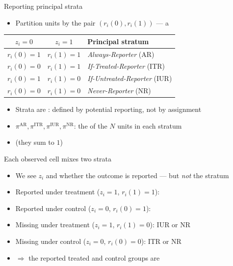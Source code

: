 \documentclass[table, xcolor = {dvipsnames}, 9pt]{beamer}
\theoremstyle{plain}
\newcommand{\mh}[1]{{\color{magenta}{#1}}}
\begin{document}
\begin{frame}[t]{Reporting principal strata}
\vfill
\begin{itemize} \vfill
\item Partition units by the pair $\left(r_i(0), r_i(1)\right)$ --- a \mh{principal stratum} \vfill
\end{itemize}
\vfill
\begin{table}[H]
\centering
\begin{tabular}{c|c|l}
$z_i = 0$ & $z_i = 1$ & Principal stratum \\ \hline
$r_i(0) = 1$ & $r_i(1) = 1$ & \textit{Always-Reporter} (AR) \\
$r_i(0) = 0$ & $r_i(1) = 1$ & \textit{If-Treated-Reporter} (ITR) \\
$r_i(0) = 1$ & $r_i(1) = 0$ & \textit{If-Untreated-Reporter} (IUR) \\
$r_i(0) = 0$ & $r_i(1) = 0$ & \textit{Never-Reporter} (NR) \\
\end{tabular}
\end{table}
\vfill
\begin{itemize} \vfill
\item Strata are \mh{fixed}: defined by potential reporting, not by assignment \vfill
\item $\pi^{\textrm{AR}}, \pi^{\textrm{ITR}}, \pi^{\textrm{IUR}}, \pi^{\textrm{NR}}$: the \mh{share} of the $N$ units in each stratum \vfill
\item[] (they sum to $1$) \vfill
\end{itemize} \vfill
\end{frame}
\begin{frame}[t]{Each observed cell mixes two strata}
\vfill
\begin{itemize} \vfill
\item We see $z_i$ and whether the outcome is reported --- but \emph{not} the stratum \vfill
\item Reported under treatment ($z_i = 1$, $r_i(1) = 1$): \mh{AR or ITR} \vfill
\item Reported under control ($z_i = 0$, $r_i(0) = 1$): \mh{AR or IUR} \vfill
\item Missing under treatment ($z_i = 1$, $r_i(1) = 0$): IUR or NR \vfill
\item Missing under control ($z_i = 0$, $r_i(0) = 0$): ITR or NR \vfill
\item[] $\Rightarrow$ the reported treated and control groups are \mh{different mixtures} \vfill
\end{itemize} \vfill
\end{frame}
\end{document}
